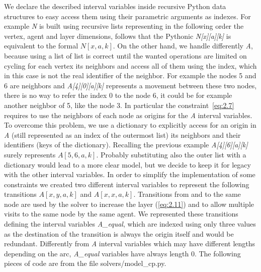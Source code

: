 \documentclass[12pt, a4paper, hidelinks]{article}
\numberwithin{equation}{section}
\begin{document}
We declare the described interval variables inside recursive Python data structures to easy access them using their parametric arguments as indexes.
For example \textit{N} is built using recursive lists representing in the following order the vertex, agent and layer dimensions, follows that the Pythonic \textit{N[x][a][k]} is equivalent to the formal $N[x,a,k]$.
On the other hand, we handle differently \textit{A}, because using a list of list is correct until the wanted operations are limited on cycling for each vertex its neighbors and access all of them using the index, which in this case is not the real identifier of the neighbor.
For example the nodes 5 and 6 are neighbors and \textit{A[4][0][a][k]} represents a movement between these two nodes, there is no way to refer the index 0 to the node 6, it could be for example another neighbor of 5, like the node 3.
In particular the constraint~\ref{eq:2.7} requires to use the neighbors of each node as origins for the \textit{A} interval variables.
To overcome this problem, we use a dictionary to explicitly access for an origin in \textit{A} (still represented as an index of the outermost list) its neighbors and their identifiers (keys of the dictionary).
Recalling the previous example \textit{A[4][6][a][k]} surely represents $A[5,6,a,k]$.
Probably substituting also the outer list with a dictionary would lead to a more clear model, but we decide to keep it for legacy with the other interval variables.
In order to simplify the implementation of some constraints we created two different interval variables to represent the following transitions $A[x,y,a,k]$ and $A[x,x,a,k]$.
Transitions from and to the same node are used by the solver to increase the layer (\ref{eq:2.11}) and to allow multiple visits to the same node by the same agent.
We represented these transitions defining the interval variables \textit{A\_equal}, which are indexed using only three values as the destination of the transition is always the origin itself and would be redundant.
Differently from \textit{A} interval variables which may have different lengths depending on the arc, \textit{A\_equal} variables have always length 0.
The following pieces of code are from the file solvers/model\_cp.py.
\end{document}
